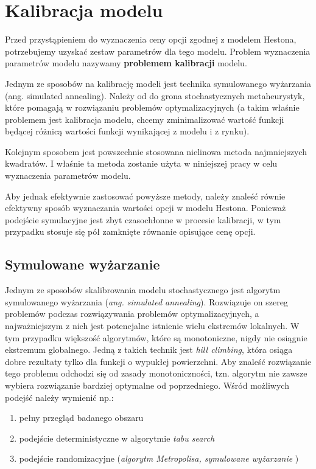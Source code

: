 \documentclass{pracamgr}
\begin{document}
\chapter{Kalibracja modelu}
\label{chap:chapterModelCalibration}

Przed przystąpieniem do wyznaczenia ceny opcji zgodnej z modelem Hestona, potrzebujemy uzyskać zestaw parametrów dla tego modelu. 
Problem wyznaczenia parametrów modelu nazywamy \textbf{problemem kalibracji} modelu.  

Jednym ze sposobów na kalibrację modeli jest technika symulowanego wyżarzania (ang. simulated annealing). Należy od do grona stochastycznych metaheurystyk, które pomagają w rozwiązaniu problemów optymalizacyjnych (a takim właśnie problemem jest kalibracja modelu, chcemy zminimalizować wartość funkcji będącej różnicą wartości funkcji wynikającej z modelu i z rynku).

Kolejnym sposobem jest powszechnie stosowana nielinowa metoda najmniejszych kwadratów. I właśnie ta metoda zostanie użyta w niniejszej pracy w celu wyznaczenia parametrów modelu.

Aby jednak efektywnie zastosować powyższe metody, należy znaleść równie efektywny sposób wyznaczania wartości opcji w modelu Hestona. Ponieważ podejście symulacyjne jest zbyt czasochłonne w procesie kalibracji, w tym przypadku stosuje się pół zamknięte równanie opisujące cenę opcji.

\section{Symulowane wyżarzanie}

Jednym ze sposobów skalibrowania modelu stochastycznego jest algorytm symulowanego wyżarzania  (\textit{ang. simulated annealing}). Rozwiązuje on szereg problemów podczas rozwiązywania problemów optymalizacyjnych, a najważniejszym z nich jest potencjalne istnienie wielu ekstremów lokalnych.
W tym przypadku większość algorytmów, które są monotoniczne, nigdy nie osiągnie ekstremum globalnego. Jedną z takich technik jest \textit{hill climbing}, która osiąga dobre rezultaty tylko dla funkcji o wypukłej powierzchni. Aby znaleść rozwiązanie tego problemu odchodzi się od zasady monotoniczności, tzn. algorytm nie zawsze wybiera rozwiązanie bardziej optymalne od poprzedniego. 
Wśród możliwych podejść należy wymienić np.:
\begin{enumerate}
  \item pełny przegląd badanego obszaru
  \item podejście deterministyczne w algorytmie \textit{tabu search}
  \item podejście randomizacyjne (\textit{algorytm Metropolisa, symulowane wyżarzanie} \cite{OptimalizationBySimulatedAnnealing} )
\end{enumerate}
\end{document}
